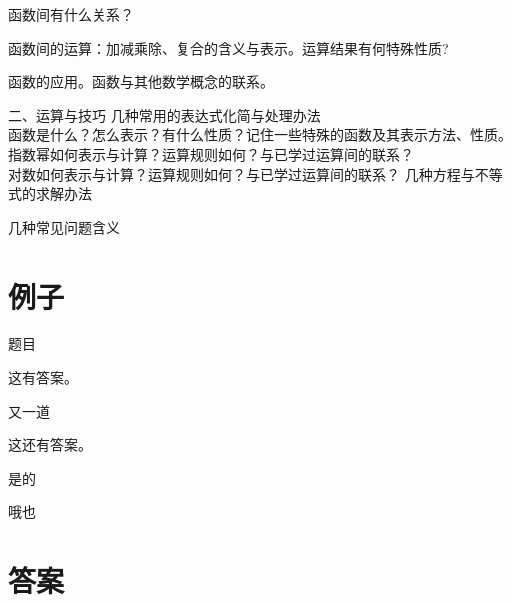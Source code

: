 函数间有什么关系？

函数间的运算：加减乘除、复合的含义与表示。运算结果有何特殊性质?

函数的应用。函数与其他数学概念的联系。

二、运算与技巧
几种常用的表达式化简与处理办法\\
函数是什么？怎么表示？有什么性质？记住一些特殊的函数及其表示方法、性质。\\
指数幂如何表示与计算？运算规则如何？与已学过运算间的联系？\\
对数如何表示与计算？运算规则如何？与已学过运算间的联系？
几种方程与不等式的求解办法

几种常见问题含义

\chapter{例子}
\begin{exercise}
\item 题目
\begin{answer}
这有答案。
\end{answer}
\item 又一道
\begin{answer}
这还有答案。
\end{answer}
\end{exercise}
\begin{exercise}
  \item 是的
  \item 哦也
  \begin{answer}

\end{answer}
\end{exercise}
\stopexercise

\chapter{答案}
\printanswer









